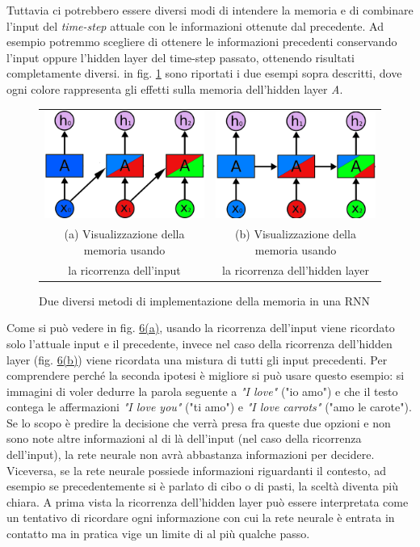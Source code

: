Tuttavia ci potrebbero essere diversi modi di intendere la memoria e di combinare l'input del \textit{time-step} attuale con le informazioni ottenute dal precedente. Ad esempio potremmo scegliere di ottenere le informazioni precedenti conservando l'input oppure l'hidden layer del time-step passato, ottenendo risultati completamente diversi. in fig. \ref{fig:1.6} sono riportati i due esempi sopra descritti, dove ogni colore rappresenta gli effetti sulla memoria dell'hidden layer \textit{A}.
\begin{figure}[ht]
	\centering
	\begin{tabular}{cc}
		\includegraphics[width=0.4\linewidth]{img/input_memory.png} &
		\includegraphics[width=0.4\linewidth]{img/hidden_memory.png} \\
		\footnotesize (a) Visualizzazione della memoria usando & \footnotesize (b) Visualizzazione della memoria usando \\ \footnotesize la ricorrenza dell'input & \footnotesize la ricorrenza dell'hidden layer
	\end{tabular}
	\caption{Due diversi metodi di implementazione della memoria in una RNN}
	\label{fig:1.6}
\end{figure}

Come si può vedere in fig. \hyperref[fig:1.6]{6(a)}, usando la ricorrenza dell'input viene ricordato solo l'attuale input e il precedente, invece nel caso della ricorrenza dell'hidden layer (fig. \hyperref[fig:1.6]{6(b)}) viene ricordata una mistura di tutti gli input precedenti. Per comprendere perché la seconda ipotesi è migliore si può usare questo esempio: si immagini di voler dedurre la parola seguente a \textit{"I love"} ("io amo") e che il testo contega le affermazioni \textit{"I love you"} ("ti amo") e \textit{"I love carrots"} ("amo le carote"). Se lo scopo è predire la decisione che verrà presa fra queste due opzioni e non sono note altre informazioni al di là dell'input (nel caso della ricorrenza dell'input), la rete neurale non avrà abbastanza informazioni per decidere. Viceversa, se la rete neurale possiede informazioni riguardanti il contesto, ad esempio se precedentemente si è parlato di cibo o di pasti, la sceltà diventa più chiara. A prima vista la ricorrenza dell'hidden layer può essere interpretata come un tentativo di ricordare ogni informazione con cui la rete neurale è entrata in contatto ma in pratica vige un limite di al più qualche passo.

